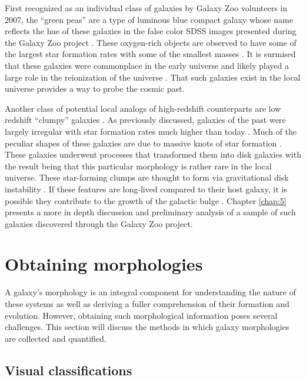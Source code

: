 First recognized as an individual class of galaxies by Galaxy Zoo volunteers in 2007, the ``green peas'' are a type of luminous blue compact galaxy whose name reflects the hue of these galaxies in the false color SDSS images presented during the Galaxy Zoo project \citep{Lintott2008,Cardamone2009}. These oxygen-rich objects are observed to have some of the largest star formation rates with some of the smallest masses \citep{Amorin2010}. It is surmised that these galaxies were commonplace in the early universe and likely played a large role in the reionization of the universe \citep{Izotov2016}. That such galaxies exist in the local universe provides a way to probe the cosmic past. 

Another class of potential local analogs of high-redshift counterparts are low redshift ``clumpy'' galaxies \citep{Elmegreen2005,Elmegreen2013}. As previously discussed, galaxies of the past were largely irregular with star formation rates much higher than today \citep{Madau2014}. Much of the peculiar shapes of these galaxies are due to massive knots of star formation \citep{Guo2015}. These galaxies underwent processes that transformed them into disk galaxies with the result being that this particular morphology is rather rare in the local universe. These star-forming clumps are thought to form via gravitational disk instability \citep{Toomre1964}. If these features are long-lived compared to their host galaxy, it is possible they contribute to the growth of the galactic bulge \citep{Conselice2014}. Chapter \ref{chap:5} presents a more in depth discussion and preliminary analysis of a sample of such galaxies discovered through the Galaxy Zoo project.


\section{Obtaining morphologies}
\label{chap1: obtaining morphologies}

A galaxy's morphology is an integral component for understanding the nature of these systems as well as deriving a fuller comprehension of their formation and evolution. However, obtaining such morphological information poses several challenges. This section will discuss the methods in which galaxy morphologies are collected and quantified. 

\subsection{Visual classifications}
\label{chap1: visual}

